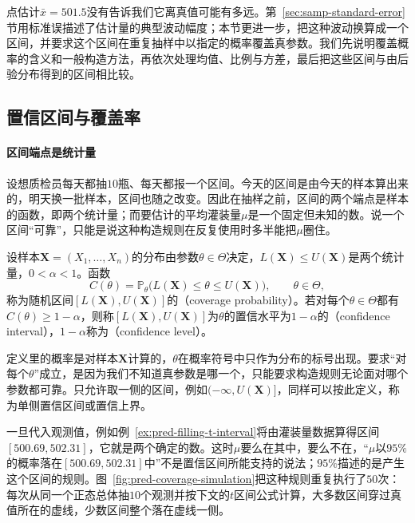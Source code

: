 点估计$\bar x=501.5$没有告诉我们它离真值可能有多远。第~\ref{sec:samp-standard-error}节用标准误描述了估计量的典型波动幅度；本节更进一步，把这种波动换算成一个区间，并要求这个区间在重复抽样中以指定的概率覆盖真参数。我们先说明覆盖概率的含义和一般构造方法，再依次处理均值、比例与方差，最后把这些区间与由后验分布得到的区间相比较。

\subsection{置信区间与覆盖率}

\paragraph{区间端点是统计量}

设想质检员每天都抽$10$瓶、每天都报一个区间。今天的区间是由今天的样本算出来的，明天换一批样本，区间也随之改变。因此在抽样之前，区间的两个端点是样本的函数，即两个统计量；而要估计的平均灌装量$\mu$是一个固定但未知的数。说一个区间“可靠”，只能是说这种构造规则在反复使用时多半能把$\mu$圈住。

\begin{definition}[置信区间]
\label{def:pred-confidence-interval}
设样本$\bm X=(X_1,\dots,X_n)$的分布由参数$\theta\in\Theta$决定，$L(\bm X)\leq U(\bm X)$是两个统计量，$0<\alpha<1$。函数
\[
 C(\theta)=\mathbb P_\theta\bigl(L(\bm X)\leq\theta\leq U(\bm X)\bigr),\qquad\theta\in\Theta,
\]
称为随机区间$[L(\bm X),U(\bm X)]$的（coverage probability）。若对每个$\theta\in\Theta$都有$C(\theta)\geq1-\alpha$，则称$[L(\bm X),U(\bm X)]$为$\theta$的置信水平为$1-\alpha$的（confidence interval），$1-\alpha$称为（confidence level）。
\end{definition}

定义里的概率是对样本$\bm X$计算的，$\theta$在概率符号中只作为分布的标号出现。要求“对每个$\theta$”成立，是因为我们不知道真参数是哪一个，只能要求构造规则无论面对哪个参数都可靠。只允许取一侧的区间，例如$(-\infty,U(\bm X)]$，同样可以按此定义，称为单侧置信区间或置信上界。

一旦代入观测值，例如例~\ref{ex:pred-filling-t-interval}将由灌装量数据算得区间$[500.69,502.31]$，它就是两个确定的数。这时$\mu$要么在其中，要么不在，“$\mu$以$95\%$的概率落在$[500.69,502.31]$中”不是置信区间所能支持的说法；$95\%$描述的是产生这个区间的规则。图~\ref{fig:pred-coverage-simulation}把这种规则重复执行了$50$次：每次从同一个正态总体抽$10$个观测并按下文的$t$区间公式计算，大多数区间穿过真值所在的虚线，少数区间整个落在虚线一侧。


